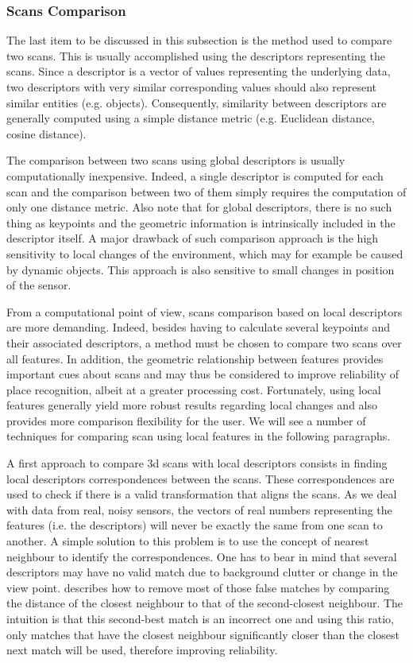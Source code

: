 \subsubsection{Scans Comparison}
\label{ssub:scans_comparison}

The last item to be discussed in this subsection is the method used to compare two scans. This is usually accomplished using the descriptors representing the scans. Since a descriptor is a vector of values representing the underlying data, two descriptors with very similar corresponding values should also represent similar entities (e.g. objects). Consequently, similarity between descriptors are generally computed using a simple distance metric (e.g. Euclidean distance, cosine distance).

The comparison between two scans using global descriptors is usually computationally inexpensive. Indeed, a single descriptor is computed for each scan and the comparison between two of them simply requires the computation of only one distance metric. Also note that for global descriptors, there is no such thing as keypoints and the geometric information is intrinsically included in the descriptor itself. A major drawback of such comparison approach is the high sensitivity to local changes of the environment, which may for example be caused by dynamic objects. This approach is also sensitive to small changes in position of the sensor.

From a computational point of view, scans comparison based on local descriptors are more demanding. Indeed, besides having to calculate several keypoints and their associated descriptors, a method must be chosen to compare two scans over all features. In addition, the geometric relationship between features provides important cues about scans and may thus be considered to improve reliability of place recognition, albeit at a greater processing cost. Fortunately, using local features generally yield more robust results regarding local changes and also provides more comparison flexibility for the user. We will see a number of techniques for comparing scan using local features in the following paragraphs.

A first approach to compare \gls*{3d} scans with local descriptors consists in finding local descriptors correspondences between the scans. These correspondences are used to check if there is a valid transformation that aligns the scans. As we deal with data from real, noisy sensors, the vectors of real numbers representing the features (i.e. the descriptors) will never be exactly the same from one scan to another. A simple solution to this problem is to use the concept of nearest neighbour to identify the correspondences. One has to bear in mind that several descriptors may have no valid match due to background clutter or change in the view point. \cite[Section 7.1]{Lowe2004} describes how to remove most of those false matches by comparing the distance of the closest neighbour to that of the second-closest neighbour. The intuition is that this second-best match is an incorrect one and using this ratio, only matches that have the closest neighbour significantly closer than the closest next match will be used, therefore improving reliability.


